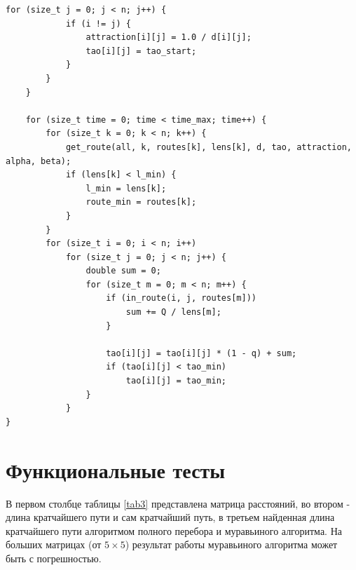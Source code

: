 \documentclass[a4paper,oneside,14pt]{extreport}
\begin{document}
\newpage
\begin{lstlisting}[label={lst:conv2},caption=Реализация муравьиного алгоритма(часть 3)]
		for (size_t j = 0; j < n; j++) {
			if (i != j) {
				attraction[i][j] = 1.0 / d[i][j];
				tao[i][j] = tao_start;
			}
		}
	}

	for (size_t time = 0; time < time_max; time++) {
		for (size_t k = 0; k < n; k++) {
			get_route(all, k, routes[k], lens[k], d, tao, attraction, alpha, beta);
			if (lens[k] < l_min) {
				l_min = lens[k];
				route_min = routes[k];
			}
		}
		for (size_t i = 0; i < n; i++)
			for (size_t j = 0; j < n; j++) {
				double sum = 0;
				for (size_t m = 0; m < n; m++) {
					if (in_route(i, j, routes[m]))
						sum += Q / lens[m];
					}
				
					tao[i][j] = tao[i][j] * (1 - q) + sum;
					if (tao[i][j] < tao_min)
						tao[i][j] = tao_min;
				}
			}
}
\end{lstlisting}

\section{Функциональные тесты}

В первом столбце таблицы \ref{tab3} представлена матрица расстояний, во втором - длина кратчайшего пути и сам кратчайший путь, в третьем найденная длина кратчайшего пути алгоритмом полного перебора и муравьиного алгоритма. На больших матрицах (от $5\times5$) результат работы муравьиного алгоритма может быть с погрешностью. 
\end{document}
